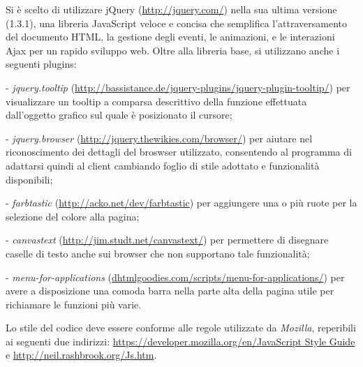 Si \` e scelto di utilizzare jQuery (\href{http://jquery.com/}{http://jquery.com/}) nella sua ultima versione (1.3.1), una libreria JavaScript veloce e concisa che semplifica l'attraversamento del documento HTML, la gestione degli eventi, le animazioni, e le interazioni Ajax per un rapido sviluppo web. Oltre alla libreria base, si utilizzano anche i seguenti plugins:
 \begin{elencopuntato}[\normindent]
    \item[-] \textit{jquery.tooltip}  (\href{http://bassistance.de/jquery-plugins/jquery-plugin-tooltip/}{http://bassistance.de/jquery-plugins/jquery-plugin-tooltip/}) per visualizzare un tooltip a comparsa descrittivo della funzione effettuata dall'oggetto grafico sul quale \` e posizionato il cursore;
    \item[-]\textit{jquery.browser}  (\href{http://jquery.thewikies.com/browser/}{http://jquery.thewikies.com/browser/}) per aiutare nel riconoscimento dei dettagli del broswser utilizzato, consentendo al programma di adattarsi quindi al client cambiando foglio di stile adottato e funzionalit\` a disponibili;
    \item[-]\textit{farbtastic} (\href{http://acko.net/dev/farbtastic}{http://acko.net/dev/farbtastic}) per aggiungere una o pi\` u ruote per la selezione del colore alla pagina;
    \item[-]\textit{canvastext} (\href{http://jim.studt.net/canvastext/}{http://jim.studt.net/canvastext/}) per permettere di disegnare caselle di testo anche sui browser che non supportano tale funzionalit\` a;
     \item[-]\textit{menu-for-applications} (\href{http://www.dhtmlgoodies.com/scripts/menu-for-applications/demos/demo-menu-bar.html}{dhtmlgoodies.com/scripts/menu-for-applications/}) per avere a disposizione una comoda barra nella parte alta della pagina utile per richiamare le funzioni pi\` u varie.
  \end{elencopuntato}

Lo stile del codice deve essere conforme alle regole utilizzate da \textit{Mozilla}, reperibili ai seguenti due indirizzi: \href{https://developer.mozilla.org/en/JavaScript_style_guide}{https://developer.mozilla.org/en/JavaScript Style Guide} e \href{http://neil.rashbrook.org/Js.htm}{http://neil.rashbrook.org/Js.htm}.

 
